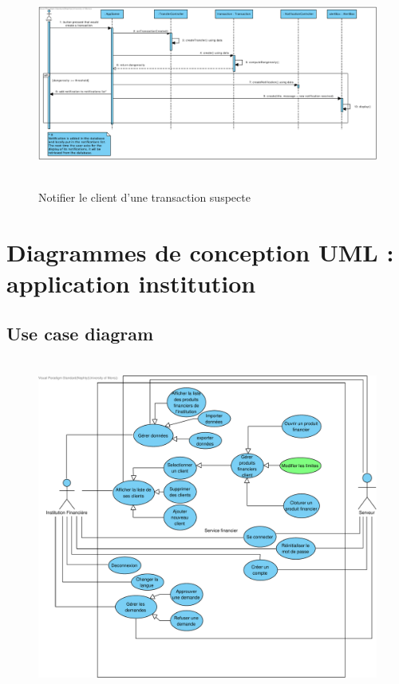 \documentclass[]{report}
\begin{document}
\newpage

\begin{figure}[h!]
\hbox{
	\centering\includegraphics[width=\linewidth]{img/Sequence 9 - Extension 6.pdf}
}
\caption{Notifier le client d'une transaction suspecte}
\end{figure}

\newpage




\section{Diagrammes de conception UML : application institution}




\subsection{Use case diagram}

\begin{figure}[h!]
\hbox{
	\centering\includegraphics[width=\linewidth]{img/Use Case Institution - Extension 6.pdf}
}
\end{figure}
\end{document}
